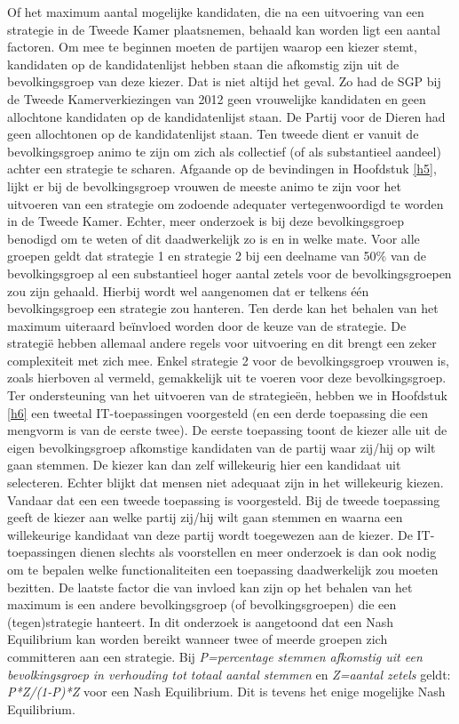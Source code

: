 Of het maximum aantal mogelijke kandidaten, die na een uitvoering van een strategie in de Tweede Kamer plaatsnemen, behaald kan worden ligt een aantal factoren. Om mee te beginnen moeten de partijen waarop een kiezer stemt, kandidaten op de kandidatenlijst hebben staan die afkomstig zijn uit de bevolkingsgroep van deze kiezer. Dat is niet altijd het geval. Zo had de SGP bij de Tweede Kamerverkiezingen van 2012 geen vrouwelijke kandidaten en geen allochtone kandidaten op de kandidatenlijst staan. De Partij voor de Dieren had geen allochtonen op de kandidatenlijst staan. Ten tweede dient er vanuit de bevolkingsgroep animo te zijn om zich als collectief (of als substantieel aandeel) achter een strategie te scharen. Afgaande op de bevindingen in Hoofdstuk \ref{h5}, lijkt er bij de bevolkingsgroep vrouwen de meeste animo te zijn voor het uitvoeren van een strategie om zodoende adequater vertegenwoordigd te worden in de Tweede Kamer. Echter, meer onderzoek is bij deze bevolkingsgroep benodigd om te weten of dit daadwerkelijk zo is en in welke mate. Voor alle groepen geldt dat strategie 1 en strategie 2 bij een deelname van 50\% van de bevolkingsgroep al een substantieel hoger aantal zetels voor de bevolkingsgroepen zou zijn gehaald. Hierbij wordt wel aangenomen dat er telkens één bevolkingsgroep een strategie zou hanteren. Ten derde kan het behalen van het maximum uiteraard be\"{i}nvloed worden door de keuze van de strategie. De strategi\"{e} hebben allemaal andere regels voor uitvoering en dit brengt een zeker complexiteit met zich mee. Enkel strategie 2 voor de bevolkingsgroep vrouwen is, zoals hierboven al vermeld, gemakkelijk uit te voeren voor deze bevolkingsgroep. Ter ondersteuning van het uitvoeren van de strategie\"{e}n, hebben we in Hoofdstuk \ref{h6} een tweetal IT-toepassingen voorgesteld (en een derde toepassing die een mengvorm is van de eerste twee). De eerste toepassing toont de kiezer alle uit de eigen bevolkingsgroep afkomstige kandidaten van de partij waar zij/hij op wilt gaan stemmen. De kiezer kan dan zelf willekeurig hier een kandidaat uit selecteren. Echter blijkt dat mensen niet adequaat zijn in het willekeurig kiezen. Vandaar dat een een tweede toepassing is voorgesteld. Bij de tweede toepassing geeft de kiezer aan welke partij zij/hij wilt gaan stemmen en waarna een willekeurige kandidaat van deze partij wordt toegewezen aan de kiezer. De IT-toepassingen dienen slechts als voorstellen en meer onderzoek is dan ook nodig om te bepalen welke functionaliteiten een toepassing daadwerkelijk zou moeten bezitten. De laatste factor die van invloed kan zijn op het behalen van het maximum is een andere bevolkingsgroep (of bevolkingsgroepen) die een (tegen)strategie hanteert. In dit onderzoek is aangetoond dat een Nash Equilibrium kan worden bereikt wanneer twee of meerde groepen zich committeren aan een strategie. Bij \textit{P=percentage stemmen afkomstig uit een bevolkingsgroep in verhouding tot totaal aantal stemmen} en \textit{Z=aantal zetels} geldt: \textit{P*Z/(1-P)*Z} voor een Nash Equilibrium. Dit is tevens het enige mogelijke Nash Equilibrium.

